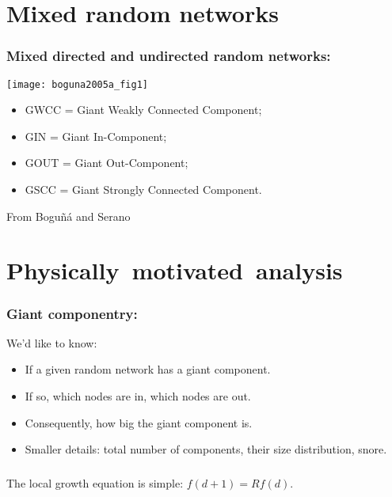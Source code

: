 \section{Mixed random networks}

\begin{frame}
  \frametitle{Mixed directed and undirected random networks:}

  \texttt{[image: boguna2005a\_fig1]}

  \small

  \begin{itemize}
  \item 
    GWCC = Giant Weakly Connected Component;
  \item 
    GIN = Giant In-Component;
  \item 
    GOUT = Giant Out-Component;
  \item 
    GSCC = Giant Strongly Connected Component.
  \end{itemize}

  \medskip

  From Bogu\~{n}\'{a} and Serano\cite{boguna2005a}

\end{frame}

\section{Physically\ motivated\ analysis}

\begin{frame}
  \frametitle{Giant componentry:}

  \begin{block}{We'd like to know:}
    
  \begin{itemize}
  \item<1->
    If a given random network has a giant component.
  \item<2->
    If so, which nodes are in, which nodes are out.
  \item<3->
    Consequently, how big the giant component is.
  \item<4->
    Smaller details: total number of components,
    their size distribution, snore.
  \end{itemize}
  \end{block}


\end{frame}

\begin{frame}
  \frametitle{}

  The local growth equation is simple: $f(d+1) = R f(d)$.

\end{frame}

